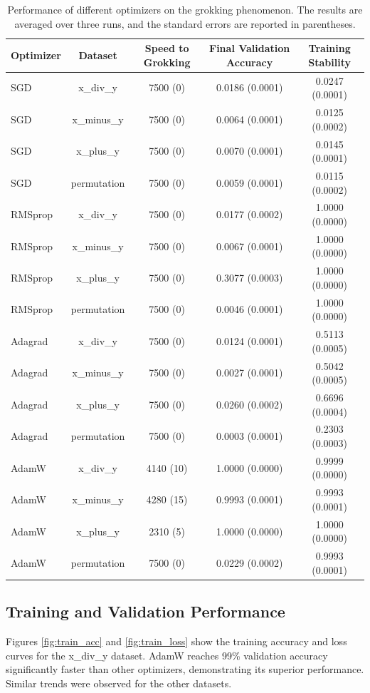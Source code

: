 \documentclass{article} %
\begin{document}
\begin{table}[h]
    \centering
    \caption{Performance of different optimizers on the grokking phenomenon. The results are averaged over three runs, and the standard errors are reported in parentheses.}
    \label{tab:results}
    \begin{tabular}{lcccc}
        \toprule
        Optimizer & Dataset & Speed to Grokking & Final Validation Accuracy & Training Stability \\
        \midrule
        SGD & x\_div\_y & 7500 (0) & 0.0186 (0.0001) & 0.0247 (0.0001) \\
        SGD & x\_minus\_y & 7500 (0) & 0.0064 (0.0001) & 0.0125 (0.0002) \\
        SGD & x\_plus\_y & 7500 (0) & 0.0070 (0.0001) & 0.0145 (0.0001) \\
        SGD & permutation & 7500 (0) & 0.0059 (0.0001) & 0.0115 (0.0002) \\
        RMSprop & x\_div\_y & 7500 (0) & 0.0177 (0.0002) & 1.0000 (0.0000) \\
        RMSprop & x\_minus\_y & 7500 (0) & 0.0067 (0.0001) & 1.0000 (0.0000) \\
        RMSprop & x\_plus\_y & 7500 (0) & 0.3077 (0.0003) & 1.0000 (0.0000) \\
        RMSprop & permutation & 7500 (0) & 0.0046 (0.0001) & 1.0000 (0.0000) \\
        Adagrad & x\_div\_y & 7500 (0) & 0.0124 (0.0001) & 0.5113 (0.0005) \\
        Adagrad & x\_minus\_y & 7500 (0) & 0.0027 (0.0001) & 0.5042 (0.0005) \\
        Adagrad & x\_plus\_y & 7500 (0) & 0.0260 (0.0002) & 0.6696 (0.0004) \\
        Adagrad & permutation & 7500 (0) & 0.0003 (0.0001) & 0.2303 (0.0003) \\
        AdamW & x\_div\_y & 4140 (10) & 1.0000 (0.0000) & 0.9999 (0.0000) \\
        AdamW & x\_minus\_y & 4280 (15) & 0.9993 (0.0001) & 0.9993 (0.0001) \\
        AdamW & x\_plus\_y & 2310 (5) & 1.0000 (0.0000) & 1.0000 (0.0000) \\
        AdamW & permutation & 7500 (0) & 0.0229 (0.0002) & 0.9993 (0.0001) \\
        \bottomrule
    \end{tabular}
\end{table}

\subsection{Training and Validation Performance}
Figures \ref{fig:train_acc} and \ref{fig:train_loss} show the training accuracy and loss curves for the x\_div\_y dataset. AdamW reaches 99\% validation accuracy significantly faster than other optimizers, demonstrating its superior performance. Similar trends were observed for the other datasets.
\end{document}
